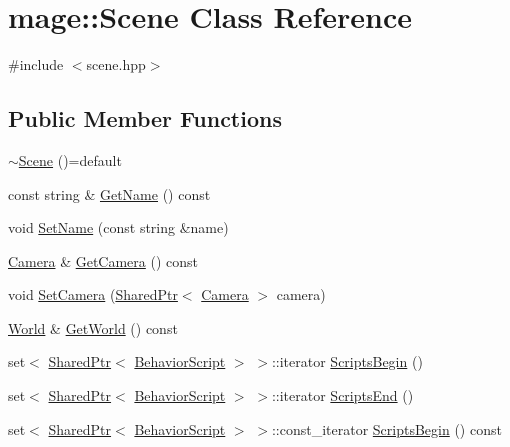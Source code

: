 \hypertarget{classmage_1_1_scene}{}\section{mage\+:\+:Scene Class Reference}
\label{classmage_1_1_scene}


{\ttfamily \#include $<$scene.\+hpp$>$}

\subsection*{Public Member Functions}
\begin{DoxyCompactItemize}
\item 
\hyperlink{classmage_1_1_scene_a6b97d0181285a69bd0a9789f534abc43}{$\sim$\+Scene} ()=default
\item 
const string \& \hyperlink{classmage_1_1_scene_a251ff8f6ce0da5c55ee31e3450b5fb9a}{Get\+Name} () const
\item 
void \hyperlink{classmage_1_1_scene_a9b7c1c2f84cc3b3c5ff3de4f29d830e9}{Set\+Name} (const string \&name)
\item 
\hyperlink{classmage_1_1_camera}{Camera} \& \hyperlink{classmage_1_1_scene_a8b2ad419541a51353d6f56ba12f43d79}{Get\+Camera} () const
\item 
void \hyperlink{classmage_1_1_scene_a57718151e0102306b3abb22da45ae27a}{Set\+Camera} (\hyperlink{namespacemage_a1e01ae66713838a7a67d30e44c67703e}{Shared\+Ptr}$<$ \hyperlink{classmage_1_1_camera}{Camera} $>$ camera)
\item 
\hyperlink{classmage_1_1_world}{World} \& \hyperlink{classmage_1_1_scene_a0365a6a2e83519ad33280cc607408b4a}{Get\+World} () const
\item 
set$<$ \hyperlink{namespacemage_a1e01ae66713838a7a67d30e44c67703e}{Shared\+Ptr}$<$ \hyperlink{classmage_1_1_behavior_script}{Behavior\+Script} $>$ $>$\+::iterator \hyperlink{classmage_1_1_scene_a2f6106acc0e29378736cf8e9bbcd8c20}{Scripts\+Begin} ()
\item 
set$<$ \hyperlink{namespacemage_a1e01ae66713838a7a67d30e44c67703e}{Shared\+Ptr}$<$ \hyperlink{classmage_1_1_behavior_script}{Behavior\+Script} $>$ $>$\+::iterator \hyperlink{classmage_1_1_scene_a2b0d4504f5b683767f1cd08ca8ab6f42}{Scripts\+End} ()
\item 
set$<$ \hyperlink{namespacemage_a1e01ae66713838a7a67d30e44c67703e}{Shared\+Ptr}$<$ \hyperlink{classmage_1_1_behavior_script}{Behavior\+Script} $>$ $>$\+::const\+\_\+iterator \hyperlink{classmage_1_1_scene_abf8804b118e5ba4736ece404da0fbf90}{Scripts\+Begin} () const

\end{DoxyCompactItemize}
